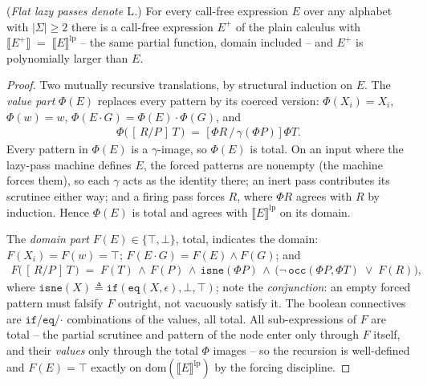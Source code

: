 \begin{theorem}
    \label{thm:flatlazy}
    (\emph{Flat lazy passes denote $\mathrm{L}$.})  For every call-free
    expression $E$ over any alphabet with $|\Sigma| \geq 2$ there is a
    call-free expression $E^{+}$ of the plain calculus with
    $\llbracket E^{+} \rrbracket \;=\; \llbracket E \rrbracket^{\mathrm{lp}}$
    -- the same partial function, domain included -- and $E^{+}$ is
    polynomially larger than $E$.
\end{theorem}

\begin{proof}
    Two mutually recursive translations, by structural induction on $E$.
    The \emph{value part} $\Phi(E)$ replaces every pattern by its
    coerced version:
    $\Phi(X_i) = X_i$, $\Phi(w) = w$,
    $\Phi(E \cdot G) = \Phi(E) \cdot \Phi(G)$, and
    \begin{align*}
      \Phi\big(\,[\,R/P\,]\,T\,\big) \;=\;
      \big[\,\Phi R\,/\,\gamma(\Phi P)\,\big]\,\Phi T .
    \end{align*}
    Every pattern in $\Phi(E)$ is a $\gamma$-image, so $\Phi(E)$ is
    total.  On an input where the lazy-pass machine defines $E$, the
    forced patterns are nonempty (the machine forces them), so each
    $\gamma$ acts as the identity there; an inert pass contributes its
    scrutinee either way; and a firing pass forces $R$, where $\Phi R$
    agrees with $R$ by induction.  Hence $\Phi(E)$ is total and agrees
    with $\llbracket E \rrbracket^{\mathrm{lp}}$ on its domain.

    The \emph{domain part} $F(E) \in \{\top, \bot\}$, total, indicates
    the domain: $F(X_i) = F(w) = \top$;
    $F(E \cdot G) = F(E) \wedge F(G)$; and
    \begin{align*}
      F\big(\,[\,R/P\,]\,T\,\big) \;=\;
      F(T) \,\wedge\, F(P) \,\wedge\, \mathtt{isne}(\Phi P)
      \,\wedge\, \big(\neg\,\mathtt{occ}(\Phi P, \Phi T)
      \;\vee\; F(R)\big),
    \end{align*}
    where $\mathtt{isne}(X) \triangleq
    \mathtt{if}(\mathtt{eq}(X,\epsilon),\bot,\top)$; note the
    \emph{conjunction}: an empty forced pattern must falsify $F$
    outright, not vacuously satisfy it.  The boolean connectives are
    $\mathtt{if}$/$\mathtt{eq}$/$\cdot$ combinations of the values, all
    total.  All sub-expressions of $F$ are total -- the partial
    scrutinee and pattern of the node enter only through $F$ itself,
    and their \emph{values} only through the total $\Phi$ images -- so
    the recursion is well-defined and $F(E) = \top$ exactly on
    $\mathrm{dom}(\llbracket E \rrbracket^{\mathrm{lp}})$ by the
    forcing discipline.


\end{proof}
